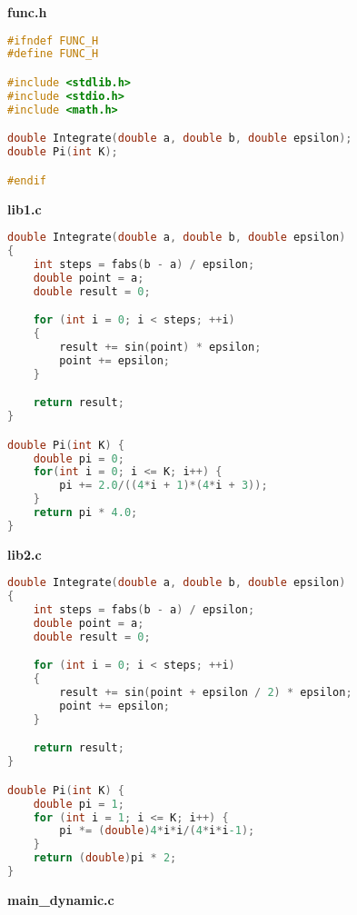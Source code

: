 \documentclass[pdf, unicode, 12pt, a4paper,oneside,fleqn]{article}
\begin{document}
{\large\textbf{func.h}}

\begin{lstlisting}[language=C]
#ifndef FUNC_H
#define FUNC_H

#include <stdlib.h>
#include <stdio.h>
#include <math.h>

double Integrate(double a, double b, double epsilon);
double Pi(int K);

#endif
\end{lstlisting}

{\large\textbf{lib1.c}}

\begin{lstlisting}[language=C]
double Integrate(double a, double b, double epsilon)
{
    int steps = fabs(b - a) / epsilon;
    double point = a;
    double result = 0;

    for (int i = 0; i < steps; ++i)
    {
        result += sin(point) * epsilon;
        point += epsilon;
    }

    return result;
}

double Pi(int K) {
    double pi = 0;
    for(int i = 0; i <= K; i++) {
        pi += 2.0/((4*i + 1)*(4*i + 3));
    }
    return pi * 4.0;
}
\end{lstlisting}

{\large\textbf{lib2.c}}

\begin{lstlisting}[language=C]
double Integrate(double a, double b, double epsilon)
{
    int steps = fabs(b - a) / epsilon;
    double point = a;
    double result = 0;

    for (int i = 0; i < steps; ++i)
    {
        result += sin(point + epsilon / 2) * epsilon;
        point += epsilon;
    }

    return result;
}

double Pi(int K) {
    double pi = 1;
    for (int i = 1; i <= K; i++) {
        pi *= (double)4*i*i/(4*i*i-1);
    }
    return (double)pi * 2;
}
\end{lstlisting}

{\large\textbf{main\_dynamic.c}}
\end{document}
